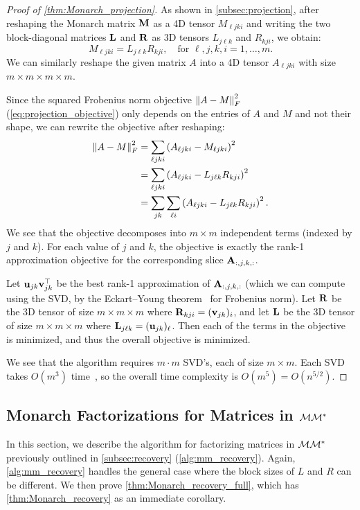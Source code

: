 \begin{proof}[Proof of \cref{thm:Monarch_projection}]
  As shown in \cref{subsec:projection}, after reshaping the Monarch matrix $\mathbf{M}$ as a 4D tensor $M_{\ell  jki}$ and writing the two block-diagonal matrices $\mathbf{L}$ and $\mathbf{R}$ as 3D tensors $L_{j \ell  k}$ and $R_{k j i}$, we obtain:
  \begin{equation*}
    M_{\ell  j k i} = L_{j \ell  k} R_{k j i}, \quad \text{for } \ell, j, k, i = 1, \dots, m.
  \end{equation*}
  We can similarly reshape the given matrix $A$ into a 4D tensor $A_{\ell j k i}$ with size $m \times m \times m \times m$.

  Since the squared Frobenius norm objective $\left\|{A - M}\right\|_F^2$ (\cref{eq:projection_objective}) only depends on the entries of $A$ and $M$ and not their shape,
  we can rewrite the objective after reshaping:
  \begin{align*}
    \left\|{A - M}\right\|_F^2
    &= \sum_{\ell  j k i} \left(A_{\ell  j k i} - M_{\ell  j k i}\right)^2 \\
    &= \sum_{\ell  j k i} \left( A_{\ell  j k i} - L_{j \ell  k} R_{k j i} \right)^2 \\
    &= \sum_{j k} \sum_{\ell i} \left( A_{\ell  j k i} - L_{j \ell  k} R_{k j i} \right)^2.
  \end{align*}
  We see that the objective decomposes into $m \times m$ independent terms (indexed by $j$ and $k$).
  For each value of $j$ and $k$, the objective is exactly the rank-1 approximation objective for the corresponding slice $\mathbf{A}_{:, j, k, :}$.

  Let $\mathbf{u}_{jk} \mathbf{v}_{jk}^\top$ be the best rank-1 approximation of $\mathbf{A}_{:, j, k, :}$ (which we can compute using the SVD, by the Eckart--Young theorem~\citep{eckart1936approximation} for Frobenius norm).
  Let $\mathbf{R}$ be the 3D tensor of size $m \times m \times m$ where $\mathbf{R}_{kji} = (\mathbf{v}_{jk})_i$, and let $\mathbf{L}$ be the 3D tensor of size $m \times m \times m$ where $\mathbf{L}_{j \ell k} = (\mathbf{u}_{jk})_\ell$.
  Then each of the terms in the objective is minimized, and thus the overall objective is minimized.

  We see that the algorithm requires $m \cdot m$ SVD's, each of size $m \times m$.
  Each SVD takes $O(m^3)$ time~\citep{trefethen2000spectral}, so the overall time complexity is $O(m^5) = O(n^{5/2})$.
\end{proof}


\subsection{Monarch Factorizations for Matrices in $\mathcal{M}\mathcal{M}^*$}
In this section, we describe the algorithm for factorizing matrices in $\mathcal{M}\mathcal{M}^*$ previously outlined in \cref{subsec:recovery} (\cref{alg:mm_recovery}). Again, \cref{alg:mm_recovery} handles the general case where the block sizes of $L$ and $R$ can be different. We then prove \cref{thm:Monarch_recovery_full}, which has \cref{thm:Monarch_recovery} as an immediate corollary.



